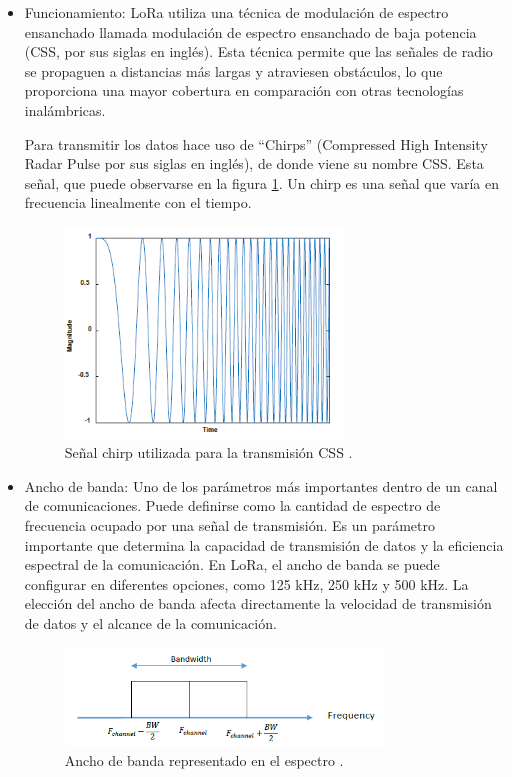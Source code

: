 \begin{itemize}
    \item Funcionamiento: LoRa utiliza una técnica de modulación de espectro ensanchado llamada modulación de espectro ensanchado de baja potencia (CSS, por sus siglas en inglés). Esta técnica permite que las señales de radio se propaguen a distancias más largas y atraviesen obstáculos, lo que proporciona una mayor cobertura en comparación con otras tecnologías inalámbricas.
    
    Para transmitir los datos hace uso de ``Chirps'' (Compressed High Intensity Radar Pulse por sus siglas en inglés), de donde viene su nombre CSS. Esta señal, que puede observarse en la figura \ref{fig:chirp}. Un chirp es una señal que varía en frecuencia linealmente con el tiempo.

    \begin{figure}[H]
        \centering
        \includegraphics[width = 0.7\textwidth]{imagenes/cap1_marcoteo/ChripSignal.png}
        \caption{Señal chirp utilizada para la transmisión CSS \citep{aloufi2020hybrid}.}
        \label{fig:chirp}
    \end{figure}

    \item Ancho de banda: Uno de los parámetros más importantes dentro de un canal de comunicaciones. Puede definirse como la cantidad de espectro de frecuencia ocupado por una señal de transmisión. Es un parámetro importante que determina la capacidad de transmisión de datos y la eficiencia espectral de la comunicación. En LoRa, el ancho de banda se puede configurar en diferentes opciones, como 125 kHz, 250 kHz y 500 kHz. La elección del ancho de banda afecta directamente la velocidad de transmisión de datos y el alcance de la comunicación.
    
    \begin{figure}[H]
        \centering
        \includegraphics[width = 0.8\textwidth]{imagenes/cap1_marcoteo/AnchodeBandaLoRa.png}
        \caption{Ancho de banda representado en el espectro \citep{aloufi2020hybrid}.}
        \label{fig:anchobanda}
    \end{figure}


\end{itemize}
